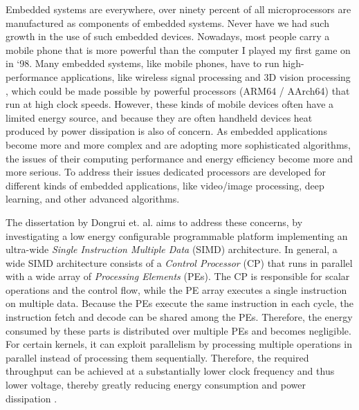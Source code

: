 



Embedded systems are everywhere, over ninety percent of all microprocessors are manufactured as components of embedded systems.
Never have we had such growth in the use of such embedded devices. Nowadays, most people carry a mobile phone that is more powerful than the computer I played my first game on in `98. %
Many embedded systems, like mobile phones, have to run high-performance applications, like wireless signal processing and 3D vision processing \cite{dongrio1}, which could be made possible by powerful processors (ARM64 / AArch64) that run at high clock speeds. However, these kinds of mobile devices often have a limited energy source, and because they are often handheld devices heat produced by power dissipation is also of concern. As embedded applications become more and more complex and are adopting more sophisticated algorithms, the issues of their computing performance and energy efficiency become more and more serious. To address their issues dedicated processors are developed for different kinds of embedded applications, like video/image processing, deep learning, and other advanced algorithms.

The dissertation by Dongrui et. al. \cite{dongrui} aims to address these concerns, by investigating a low energy configurable programmable platform implementing an ultra-wide \emph{Single Instruction Multiple Data} (SIMD) architecture. In general, a wide SIMD architecture consists of a \emph{Control Processor} (CP) that runs in parallel with a wide array of \emph{Processing Elements} (PEs). The CP is responsible for scalar operations and the control flow, while the PE array executes a single instruction on multiple data. Because the PEs execute the same instruction in each cycle, the instruction fetch and decode can be shared among the PEs. Therefore, the energy consumed by these parts is distributed over multiple PEs and becomes negligible. For certain kernels, it can exploit parallelism by processing multiple operations in parallel instead of processing them sequentially. Therefore, the required throughput can be achieved at a substantially lower clock frequency and thus lower voltage, thereby greatly reducing energy consumption and power dissipation \cite{dongrio2}.%

